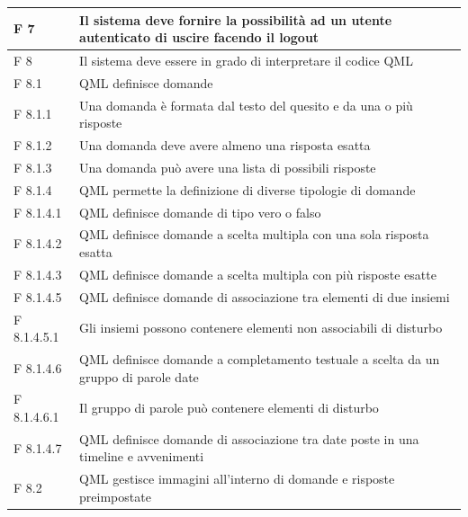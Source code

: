 \documentclass[a4paper,11pt]{article}
\begin{document}
\begin{longtable}{p{}p{}}
\midrule
F 7 & Il sistema deve fornire la possibilità ad un utente autenticato di uscire facendo il logout\\
\midrule
F 8 & Il sistema deve essere in grado di interpretare il codice QML\\
\midrule
F 8.1 & QML definisce domande\\
\midrule
F 8.1.1 & Una domanda è formata dal testo del quesito e da una o più risposte\\
\midrule
F 8.1.2 & Una domanda deve avere almeno una risposta esatta\\
\midrule
F 8.1.3 & Una domanda può avere una lista di possibili risposte\\
\midrule
F 8.1.4 & QML permette la definizione di diverse tipologie di domande\\
\midrule
F 8.1.4.1 & QML definisce domande di tipo vero o falso\\
\midrule
F 8.1.4.2 & QML definisce domande a scelta multipla con una sola risposta esatta\\
\midrule
F 8.1.4.3 & QML definisce domande a scelta multipla con più risposte esatte\\
\midrule
F 8.1.4.5 & QML definisce domande di associazione tra elementi di due insiemi\\
\midrule
F 8.1.4.5.1 & Gli insiemi possono contenere elementi non associabili di disturbo\\
\midrule
F 8.1.4.6 & QML definisce domande a completamento testuale a scelta da un gruppo di parole date\\
\midrule
F 8.1.4.6.1 & Il gruppo di parole può contenere elementi di disturbo\\
\midrule
F 8.1.4.7 & QML definisce domande di associazione tra date poste in una timeline e avvenimenti\\
\midrule
F 8.2 & QML gestisce immagini all'interno di domande e risposte preimpostate\\
			
			\end{longtable}
\end{document}
